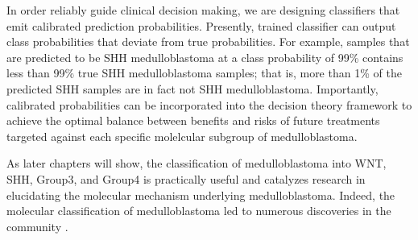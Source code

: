 In order reliably guide clinical decision making, we are designing classifiers that emit calibrated prediction probabilities. Presently, trained classifier can output class probabilities that deviate from true probabilities. For example, samples that are predicted to be SHH medulloblastoma at a class probability of 99\% contains less than 99\% true SHH medulloblastoma samples; that is, more than 1\% of the predicted SHH samples are in fact not SHH medulloblastoma. Importantly, calibrated probabilities can be incorporated into the decision theory framework to achieve the optimal balance between benefits and risks of future treatments targeted against each specific molelcular subgroup of medulloblastoma.

As later chapters will show, the classification of medulloblastoma into WNT, SHH, Group3, and Group4 is practically useful and catalyzes research in elucidating the molecular mechanism underlying medulloblastoma. Indeed, the molecular classification of medulloblastoma led to numerous discoveries in the community .


\clearpage
